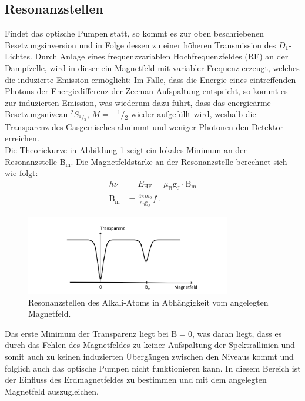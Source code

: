 \subsection{Resonanzstellen}
Findet das optische Pumpen statt, so kommt es zur oben beschriebenen Besetzungsinversion und in Folge dessen zu einer höheren Transmission des $D_1$- Lichtes.
Durch Anlage eines frequenzvariablen Hochfrequenzfeldes (RF) an der Dampfzelle, wird in dieser ein Magnetfeld mit variabler Frequenz erzeugt, welches die induzierte Emission ermöglicht:
Im Falle, dass die Energie eines eintreffenden Photons der Energiedifferenz der Zeeman-Aufspaltung entspricht, so kommt es zur induzierten Emission, was wiederum dazu führt, dass das energieärme Besetzungsniveau ${}^2S_{{}^1\!/\!_2}$, $M=-^1\!/\!_2$ wieder aufgefüllt wird, weshalb die Transparenz des Gasgemisches abnimmt und weniger Photonen den Detektor erreichen.\\ 
Die Theoriekurve in Abbildung \ref{abb:Resonanz} zeigt ein lokales Minimum an der Resonanzstelle $\text{B}_{\text{m}}$.
Die Magnetfeldstärke an der Resonanzstelle berechnet sich wie folgt:
\begin{align}
  \label{eq:2}
    h \nu &= E_{\text{HF}} = \mu_{\text{B}} \text{g}_{\text{J}} \cdot \text{B}_{\text{m}} \\
    \text{B}_{\text{m}} &= \frac{4\pi m_0}{e_0 \text{g}_{\text{J}}}f \; .
\end{align}
\FloatBarrier
\begin{figure}
    \centering
    \includegraphics[width=0.8\textwidth]{Resonanz.PNG}
    \caption{Resonanzstellen des Alkali-Atoms in Abhängigkeit vom angelegten Magnetfeld. \cite{Q1}}
    \label{abb:Resonanz}
\end{figure}
\FloatBarrier
Das erste Minimum der Transparenz liegt bei $\text{B}=0$, was daran liegt, dass es durch das Fehlen des Magnetfeldes zu keiner Aufspaltung der Spektrallinien und somit auch zu keinen induzierten Übergängen zwischen den Niveaus kommt und folglich auch das optische Pumpen nicht funktionieren kann.
In diesem Bereich ist der Einfluss des Erdmagnetfeldes zu bestimmen und mit dem angelegten Magnetfeld auszugleichen.

